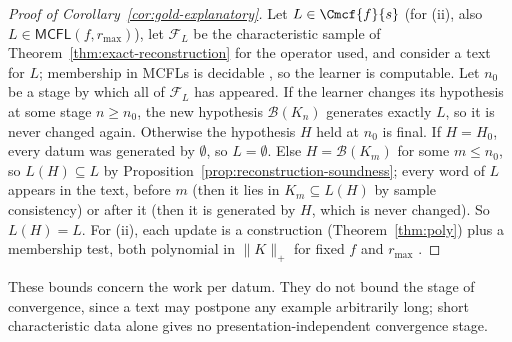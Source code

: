 \begin{proof}[Proof of Corollary~\ref{cor:gold-explanatory}]
Let $L\in\Cmcf{f}{s}$ (for (ii), also $L\in\mathsf{MCFL}(f,r_{\max})$), let $\mathcal F_L$
be the characteristic sample of Theorem~\ref{thm:exact-reconstruction} for the
operator used, and consider a text for $L$; membership in MCFLs is decidable
\cite{SekiEtAl1991}, so the learner is computable.  Let $n_0$ be a stage by which all
of $\mathcal F_L$ has appeared.  If the learner changes its hypothesis at some stage
$n\ge n_0$, the new hypothesis $\mathcal B(K_n)$ generates exactly $L$, so it is never
changed again.  Otherwise the hypothesis $H$ held at $n_0$ is final.  If $H=H_0$, every
datum was generated by $\emptyset$, so $L=\emptyset$.  Else $H=\mathcal B(K_m)$ for some
$m\le n_0$, so $L(H)\subseteq L$ by Proposition~\ref{prop:reconstruction-soundness};
every word of $L$ appears in the text, before $m$ (then it lies in $K_m\subseteq L(H)$
by sample consistency) or after it (then it is generated by $H$, which is never
changed).  So $L(H)=L$.  For (ii), each update is a construction
(Theorem~\ref{thm:poly}) plus a membership test, both polynomial in $\|K\|_+$ for fixed
$f$ and $r_{\max}$ \cite[Proposition~4]{Yoshinaka2011}.
\end{proof}

These bounds concern the work per datum.  They do not bound the stage of convergence,
since a text may postpone any example arbitrarily long; short characteristic data alone
gives no presentation-independent convergence stage.
